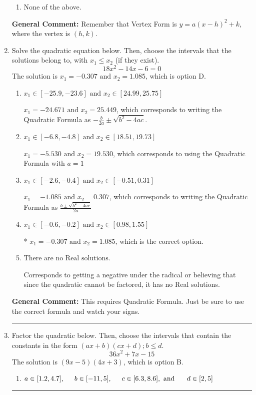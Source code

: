 \documentclass{extbook}[14pt]
\newcommand{\litem}[1]{\item #1

\rule{\textwidth}{0.4pt}}
\begin{document}
\begin{enumerate}
{\begin{enumerate}[label=\Alph*.]
\begin{multicols}{2}
\end{multicols}\item None of the above.\end{enumerate}
\textbf{General Comment:} Remember that Vertex Form is $y = a(x-h)^2+k$, where the vertex is $(h, k)$.
}
\litem{
Solve the quadratic equation below. Then, choose the intervals that the solutions belong to, with $x_1 \leq x_2$ (if they exist).
\[ 18x^{2} -14 x -6 = 0 \]The solution is \( x_1 = -0.307 \text{ and } x_2 = 1.085 \), which is option D.\begin{enumerate}[label=\Alph*.]
\item \( x_1 \in [-25.9, -23.6] \text{ and } x_2 \in [24.99, 25.75] \)

 $x_1 = -24.671 \text{ and } x_2 = 25.449$, which corresponds to writing the Quadratic Formula as $-\frac{b}{2a} \pm \sqrt{b^2 - 4ac}$.
\item \( x_1 \in [-6.8, -4.8] \text{ and } x_2 \in [18.51, 19.73] \)

 $x_1 = -5.530 \text{ and } x_2 = 19.530$, which corresponds to using the Quadratic Formula with $a=1$
\item \( x_1 \in [-2.6, -0.4] \text{ and } x_2 \in [-0.51, 0.31] \)

 $x_1 = -1.085 \text{ and } x_2 = 0.307$, which corresponds to writing the Quadratic Formula as $\frac{b \pm \sqrt{b^2 - 4ac}}{2a}$
\item \( x_1 \in [-0.6, -0.2] \text{ and } x_2 \in [0.98, 1.55] \)

* $x_1 = -0.307 \text{ and } x_2 = 1.085$, which is the correct option.
\item \( \text{There are no Real solutions.} \)

Corresponds to getting a negative under the radical or believing that since the quadratic cannot be factored, it has no Real solutions.
\end{enumerate}

\textbf{General Comment:} This requires Quadratic Formula. Just be sure to use the correct formula and watch your signs.
}
\litem{
Factor the quadratic below. Then, choose the intervals that contain the constants in the form $(ax+b)(cx+d); b \leq d.$
\[ 36x^{2} +7 x -15 \]The solution is \( (9x -5)(4x + 3) \), which is option B.\begin{enumerate}[label=\Alph*.]
\item \( a \in [1.2, 4.7], \hspace*{5mm} b \in [-11, 5], \hspace*{5mm} c \in [6.3, 8.6], \text{ and } \hspace*{5mm} d \in [2, 5] \)


\end{enumerate}}
\end{enumerate}
\end{document}

